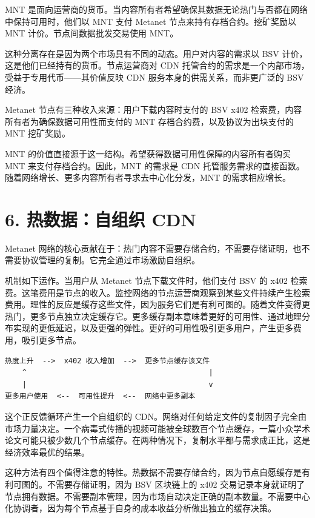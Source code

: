 \documentclass[11pt,a4paper]{article}
\begin{document}
MNT 是面向运营商的货币。当内容所有者希望确保其数据无论热门与否都在网络中保持可用时，他们以 MNT 支付 Metanet 节点来持有存档合约。挖矿奖励以 MNT 计价。节点间数据批发交易使用 MNT。

这种分离存在是因为两个市场具有不同的动态。用户对内容的需求以 BSV 计价，这是他们已经持有的货币。节点运营商对 CDN 托管合约的需求是一个内部市场，受益于专用代币——其价值反映 CDN 服务本身的供需关系，而非更广泛的 BSV 经济。

Metanet 节点有三种收入来源：用户下载内容时支付的 BSV x402 检索费，内容所有者为确保数据可用性而支付的 MNT 存档合约费，以及协议为出块支付的 MNT 挖矿奖励。

MNT 的价值直接源于这一结构。希望获得数据可用性保障的内容所有者购买 MNT 来支付存档合约。因此，MNT 的需求是 CDN 托管服务需求的直接函数。随着网络增长、更多内容所有者寻求去中心化分发，MNT 的需求相应增长。

\section{6. 热数据：自组织 CDN}

Metanet 网络的核心贡献在于：热门内容不需要存储合约，不需要存储证明，也不需要协议管理的复制。它完全通过市场激励自组织。

机制如下运作。当用户从 Metanet 节点下载文件时，他们支付 BSV 的 x402 检索费。这笔费用是节点的收入。监控网络的节点运营商观察到某些文件持续产生检索费用。理性的反应是缓存这些文件，因为服务它们是有利可图的。随着文件变得更热门，更多节点独立决定缓存它。更多缓存副本意味着更好的可用性、通过地理分布实现的更低延迟，以及更强的弹性。更好的可用性吸引更多用户，产生更多费用，吸引更多节点。

\begin{lstlisting}
热度上升  -->  x402 收入增加  -->  更多节点缓存该文件
    ^                                          |
    |                                          v
更多用户使用  <--  可用性提升  <--  网络中更多副本
\end{lstlisting}

这个正反馈循环产生一个自组织的 CDN。网络对任何给定文件的复制因子完全由市场力量决定。一个病毒式传播的视频可能被全球数百个节点缓存，一篇小众学术论文可能只被少数几个节点缓存。在两种情况下，复制水平都与需求成正比，这是经济效率最优的结果。

这种方法有四个值得注意的特性。热数据不需要存储合约，因为节点自愿缓存是有利可图的。不需要存储证明，因为 BSV 区块链上的 x402 交易记录本身就证明了节点拥有数据。不需要副本管理，因为市场自动决定正确的副本数量。不需要中心化协调者，因为每个节点基于自身的成本收益分析做出独立的缓存决策。
\end{document}
